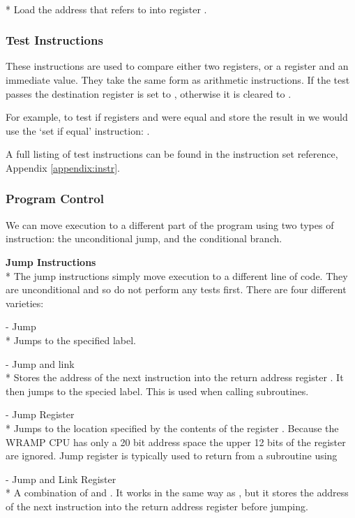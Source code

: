  \\*
Load the address that  refers to into register \regd. 

\subsubsection{Test Instructions}
These instructions are used to compare either two registers, or a
register and an immediate value. They take the same form as
arithmetic instructions. If the test passes the destination register
is set to , otherwise it is cleared to .

For example, to test if registers  and  were equal and store the
result in  we would use the `set if equal' instruction: 
.

A full listing of test instructions can be found in the instruction set reference, Appendix \ref{appendix:instr}.

\subsubsection{Program Control}
We can move execution to a different part of the program using two types
of instruction: the unconditional jump, and the conditional branch.

\textbf{Jump Instructions}\\*
The jump instructions simply move execution to a different line of
code. They are unconditional and so do not perform any tests first.
There are four different varieties:

 - Jump\\*
Jumps to the specified label.

 - Jump and link\\*
Stores the address of the next instruction into the return address register . It then jumps to the specied label. This is used when calling subroutines.

 - Jump Register\\*
Jumps to the location specified by the contents of the register \regs.
Because the WRAMP CPU has only a 20 bit address space the upper 12 bits
of the register are ignored. Jump register is typically used to
return from a subroutine using 

 - Jump and Link Register\\* 
A combination of  and . 
It works in the same way as , but it stores the address of the
next instruction into the return address register before jumping.

